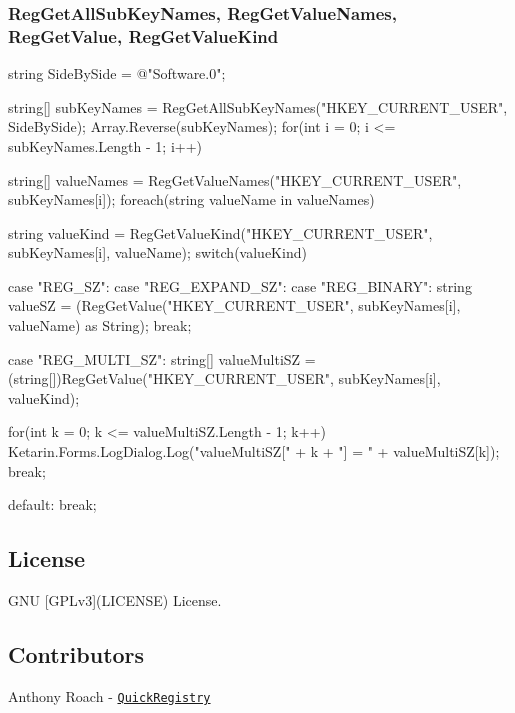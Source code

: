 \subsubsection*{Reg\+Get\+All\+Sub\+Key\+Names, Reg\+Get\+Value\+Names, Reg\+Get\+Value, Reg\+Get\+Value\+Kind}

\begin{DoxyVerb}string SideBySide = @"Software\Classes\Software\Microsoft\Windows\CurrentVersion\Deployment\SideBySide\2.0";

string[] subKeyNames = RegGetAllSubKeyNames("HKEY_CURRENT_USER", SideBySide);
Array.Reverse(subKeyNames);
for(int i = 0; i <= subKeyNames.Length - 1; i++)
{
    string[] valueNames = RegGetValueNames("HKEY_CURRENT_USER", subKeyNames[i]);
    foreach(string valueName in valueNames)
    {
        string valueKind = RegGetValueKind("HKEY_CURRENT_USER", subKeyNames[i], valueName);
        switch(valueKind)
        {
            case "REG_SZ":
            case "REG_EXPAND_SZ":
            case "REG_BINARY":
                string valueSZ = (RegGetValue("HKEY_CURRENT_USER", subKeyNames[i], valueName) as String);
                break;

            case "REG_MULTI_SZ":
                string[] valueMultiSZ = (string[])RegGetValue("HKEY_CURRENT_USER", subKeyNames[i], valueKind);

                for(int k = 0; k <= valueMultiSZ.Length - 1; k++)
                {
                    Ketarin.Forms.LogDialog.Log("valueMultiSZ[" + k + "] = " + valueMultiSZ[k]);
                }
                break;

            default:
                break;
        }
    }
}
\end{DoxyVerb}


\subsection*{License}

G\+NU \mbox{[}G\+P\+Lv3\mbox{]}(L\+I\+C\+E\+N\+SE) License.

\subsection*{Contributors}


\begin{DoxyItemize}
\item Anthony Roach -\/ \href{https://www.codeproject.com/Articles/3000/Quick-Registry-class-in-C}{\tt Quick\+Registry} 
\end{DoxyItemize}